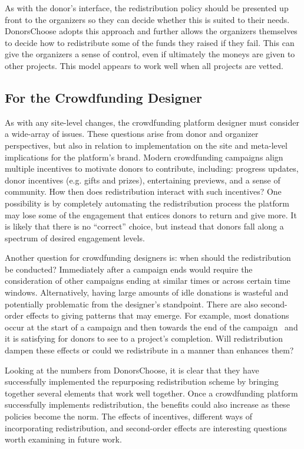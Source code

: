 As with the donor's interface, the redistribution policy should be presented up front to the organizers so they can decide whether this is suited to their needs. DonorsChoose adopts this approach and further allows the organizers themselves to decide how to redistribute some of the funds they raised if they fail. This can give the organizers a sense of control, even if ultimately the moneys are given to other projects. This model appears to work well when all projects are vetted. 



\subsection{For the Crowdfunding Designer}

As with any site-level changes, the crowdfunding platform designer must consider a wide-array of issues. These questions arise from donor and organizer perspectives, but also in relation to implementation on the site and meta-level implications for the platform's brand.
Modern crowdfunding campaigns align multiple incentives to motivate donors to contribute, including: progress updates, donor incentives (e.g. gifts and prizes), entertaining previews, and a sense of community. 
How then does redistribution interact with such incentives? One possibility is by completely automating the redistribution process the platform may lose some of the engagement that entices donors to return and give more. It is likely that there is no ``correct'' choice, but instead that donors fall along a spectrum of desired engagement levels.

Another question for crowdfunding designers is: when should the redistribution be conducted? Immediately after a campaign ends would require the consideration of other campaigns ending at similar times or across certain time windows. Alternatively, having large amounts of idle donations is wasteful and potentially problematic from the designer's standpoint.
There are also second-order effects to giving patterns that may emerge. For example, most donations occur at the start of a campaign and then towards the end of the campaign~\cite{wash-time} and it is satisfying for donors to see to a project's completion. Will redistribution dampen these effects or could we redistribute in a manner than enhances them?


Looking at the numbers from DonorsChoose, it is clear that they have successfully implemented the repurposing redistribution scheme by bringing together several elements that work well together. Once a crowdfunding platform successfully implements redistribution, the benefits could also increase as these policies become the norm. The effects of incentives, different ways of incorporating redistribution, and second-order effects are interesting questions worth examining in future work.